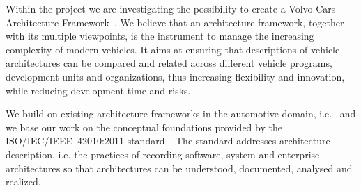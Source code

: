 \documentclass[preprint,12pt,3p]{elsarticle}
\begin{document}

Within the project we are investigating the possibility to create a Volvo Cars Architecture Framework~\cite{42010}. %
We believe that an architecture framework, together with its multiple viewpoints, is the instrument to manage the increasing complexity of modern vehicles.
It aims at ensuring that descriptions of vehicle architectures can be compared and related across different vehicle programs,
development units and organizations, thus increasing flexibility and innovation, while reducing development time and risks.

We build on existing architecture frameworks in the automotive domain, i.e.~\cite{Broy,Yania} and we base our work on the conceptual foundations provided by the ISO/IEC/IEEE~42010:2011 standard~\cite{42010}.   
The standard 
 addresses architecture description, i.e. the practices of recording software, system
and enterprise architectures so that architectures can be understood,
documented, analysed and realized. 
\end{document}
